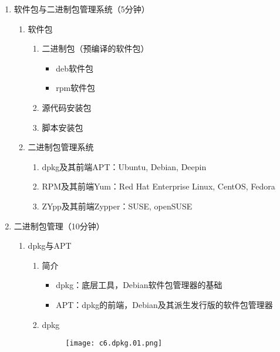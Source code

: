 \documentclass{TIJMUjiaoanSY}
\begin{document}
\noindent
\begin{enumerate}
  \item 软件包与二进制包管理系统（5分钟）
	    \vspace*{-10pt}
	\begin{multicols}{2}
    \begin{enumerate}
          \item 软件包
	\begin{enumerate}
	  \item 二进制包（预编译的软件包）
	    \begin{itemize}
	      \item deb软件包
	      \item rpm软件包
	    \end{itemize}
	  \item 源代码安装包
	  \item 脚本安装包
	\end{enumerate}
      \item 二进制包管理系统
	\begin{enumerate}
          \item dpkg及其前端APT：Ubuntu, Debian, Deepin
          \item RPM及其前端Yum：Red Hat Enterprise Linux, CentOS, Fedora
          \item ZYpp及其前端Zypper：SUSE, openSUSE
	\end{enumerate}
    \end{enumerate}
      \end{multicols}
	    \vspace*{-10pt}
  \item 二进制包管理（10分钟）
    \begin{enumerate}
      \item dpkg与APT
        \begin{enumerate}
	  \item 简介
	    \begin{itemize}
	      \item dpkg：底层工具，Debian软件包管理器的基础
	      \item APT：dpkg的前端，Debian及其派生发行版的软件包管理器
	    \end{itemize}
          \item dpkg
	    \vspace*{-10pt}
	    \begin{figure}[h]
	      \centering
	      \texttt{[image: c6.dpkg.01.png]}
	    \end{figure}
	    \vspace*{-10pt}

\end{enumerate}
\end{enumerate}
\end{enumerate}
\end{document}

